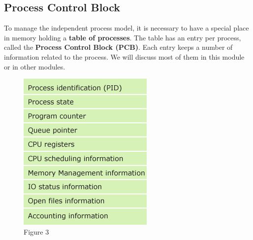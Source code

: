 \documentclass[11pt,a4paper]{scrreprt}
\begin{document}
\subsection{Process Control Block}
To manage the independent process model, it is necessary to have a special place in memory holding a \textbf{table of processes}. The table has an entry per process, called the \textbf{Process Control Block (PCB)}. Each entry keeps a number of information related to the process. We will discuss most of them in this module or in other modules.
\begin{figure}[!ht]
\centering
\includegraphics[width=0.35\linewidth]{img/PLB.png}
\caption{Figure 3}
\label{fig:figure3}
\end{figure}
\newpage
\end{document}
